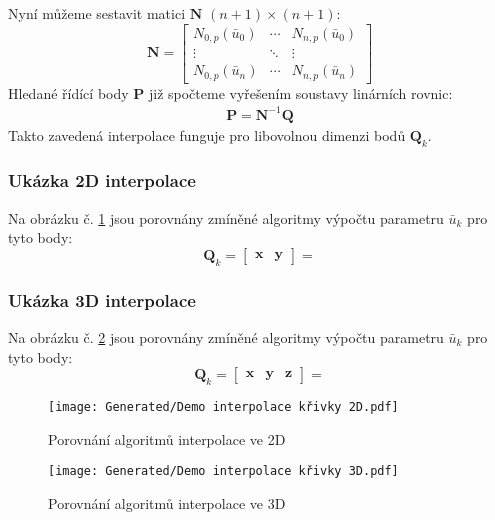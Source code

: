 Nyní můžeme sestavit matici $\bm{N}$ $(n + 1) \times (n + 1)$:
\begin{equation}
    \bm{N} = \begin{bmatrix}
        N_{0,p}(\bar{u}_0)        & \cdots & N_{n,p}(\bar{u}_0)       \\
        \vdots                    & \ddots & \vdots                     \\
        N_{0, p}(\bar{u}_{n}) & \cdots & N_{n,p}(\bar{u}_{n})
    \end{bmatrix}
\end{equation}
Hledané řídící body $\bm{P}$ již spočteme vyřešením soustavy linárních rovnic:
\begin{align}
    \bm{P} = \bm{N}^{-1}\bm{Q}
\end{align}
Takto zavedená interpolace funguje pro libovolnou dimenzi bodů $\bm{Q}_k$.

\subsubsection{Ukázka 2D interpolace}
Na obrázku č. \ref{fig:Demo interpolace 2D} jsou porovnány zmíněné algoritmy
výpočtu parametru $\bar{u}_k$ pro tyto body:
\begin{equation}
    \bm{Q}_k = \begin{bmatrix}
        \bm{x} & \bm{y}
    \end{bmatrix}
    =
\end{equation}

\subsubsection{Ukázka 3D interpolace}
Na obrázku č. \ref{fig:Demo interpolace 3D} jsou porovnány zmíněné algoritmy
výpočtu parametru $\bar{u}_k$ pro tyto body:
\begin{equation}
    \bm{Q}_k = \begin{bmatrix}
        \bm{x} & \bm{y} & \bm{z}
    \end{bmatrix}
    =
\end{equation}

\begin{imagepage}
    \begin{figure}[H]
        \centering
        \texttt{[image: Generated/Demo interpolace křivky 2D.pdf]}
        \caption{Porovnání algoritmů interpolace ve 2D}
        \label{fig:Demo interpolace 2D}
    \end{figure}
    \begin{figure}[H]
        \centering
        \texttt{[image: Generated/Demo interpolace křivky 3D.pdf]}
        \caption{Porovnání algoritmů interpolace ve 3D}
        \label{fig:Demo interpolace 3D}
    \end{figure}
\end{imagepage}